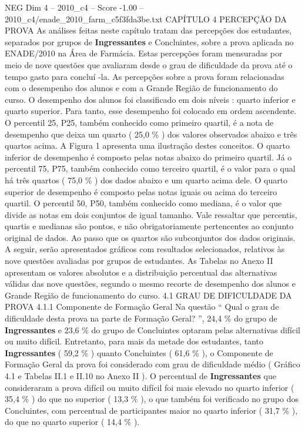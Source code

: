 \begin{textsample}{NEG Dim 4 – 2010\_c4 – Score -1.00 – 2010\_c4/enade\_2010\_farm\_c5f3fda3be.txt}  \label{ex:f4_neg_066}
CAPÍTULO 4 PERCEPÇÃO DA PROVA As análises feitas neste capítulo tratam das percepções dos estudantes, separados por grupos de \textbf{Ingressantes} e Concluintes, sobre a prova aplicada no ENADE/2010 na Área de Farmácia.
Estas percepções foram mensuradas por meio de nove questões que avaliaram desde o grau de dificuldade da prova até o tempo gasto para concluí -la.
As percepções sobre a prova foram relacionadas com o desempenho dos alunos e com a Grande Região de funcionamento do curso.
O desempenho dos alunos foi classificado em dois níveis : quarto inferior e quarto superior.
Para tanto, esse desempenho foi colocado em ordem ascendente.
O percentil 25, P25, também conhecido como primeiro quartil, é a nota de desempenho que deixa um quarto ( 25,0 \% ) dos valores observados abaixo e três quartos acima.
A Figura 1 apresenta uma ilustração destes conceitos.
O quarto inferior de desempenho é composto pelas notas abaixo do primeiro quartil.
Já o percentil 75, P75, também conhecido como terceiro quartil, é o valor para o qual há três quartos ( 75,0 \% ) dos dados abaixo e um quarto acima dele.
O quarto superior de desempenho é composto pelas notas iguais ou acima do terceiro quartil.
O percentil 50, P50, também conhecido como mediana, é o valor que divide as notas em dois conjuntos de igual tamanho.
Vale ressaltar que percentis, quartis e medianas são pontos, e não obrigatoriamente pertencentes ao conjunto original de dados.
Ao passo que os quartos são subconjuntos dos dados originais.
A seguir, serão apresentados gráficos com resultados selecionados, relativos às nove questões avaliadas por grupos de estudantes.
As Tabelas no Anexo II apresentam os valores absolutos e a distribuição percentual das alternativas válidas das nove questões, segundo o mesmo recorte de desempenho dos alunos e Grande Região de funcionamento do curso. 4.1 GRAU DE DIFICULDADE DA PROVA 4.1.1 Componente de Formação Geral Na questão “ Qual o grau de dificuldade desta prova na parte de Formação Geral? ”, 24,4 \% do grupo de \textbf{Ingressantes} e 23,6 \% do grupo de Concluintes optaram pelas alternativas difícil ou muito difícil.
Entretanto, para mais da metade dos estudantes, tanto \textbf{Ingressantes} ( 59,2 \% ) quanto Concluintes ( 61,6 \% ), o Componente de Formação Geral da prova foi considerado com grau de dificuldade médio ( Gráfico 4.1 e Tabelas II.1 e II.10 no Anexo II ).
O percentual de \textbf{Ingressantes} que consideraram a prova difícil ou muito difícil foi mais elevado no quarto inferior ( 35,4 \% ) do que no superior ( 13,3 \% ), o que também foi verificado no grupo dos Concluintes, com percentual de participantes maior no quarto inferior ( 31,7 \% ), do que no quarto superior ( 14,4 \% ).

\end{textsample}
